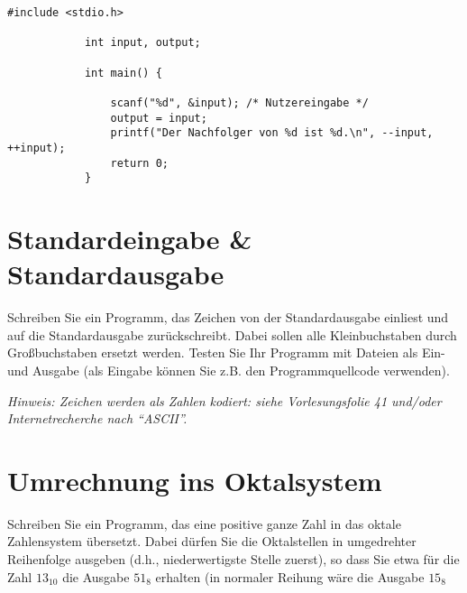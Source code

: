 \documentclass[]{article}
\begin{document}
	\quad
	\begin{minipage}{0.5\linewidth} %
		\begin{lstlisting}[gobble=6]
			#include <stdio.h>
			
			int input, output;
			
			int main() {
				
				scanf("%d", &input); /* Nutzereingabe */
				output = input;
				printf("Der Nachfolger von %d ist %d.\n", --input, ++input);
				return 0;
			}	
		\end{lstlisting}
	\end{minipage}
	
	\section{Standardeingabe \& Standardausgabe}
	
	Schreiben Sie ein Programm, das Zeichen von der Standardausgabe einliest und auf die Standardausgabe zurückschreibt.
	Dabei sollen alle Kleinbuchstaben durch Großbuchstaben ersetzt werden.
	Testen Sie Ihr Programm mit Dateien als Ein- und Ausgabe (als Eingabe können Sie z.B. den Programmquellcode verwenden).
	
	\textit{Hinweis: Zeichen werden als Zahlen kodiert: siehe Vorlesungsfolie 41 und/oder Internetrecherche nach \enquote{ASCII}.}

	\section{Umrechnung ins Oktalsystem}
	
		Schreiben Sie ein Programm, das eine positive ganze Zahl in das oktale Zahlensystem übersetzt.
		Dabei dürfen Sie die Oktalstellen in umgedrehter Reihenfolge ausgeben (d.h., niederwertigste
		Stelle zuerst), so dass Sie etwa für die Zahl $13_{10}$ die Ausgabe $51_8$ erhalten (in normaler Reihung
		wäre die Ausgabe $15_8$

	
\end{document}
